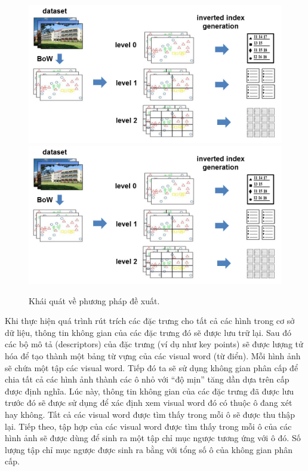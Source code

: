 \begin{figure}[!htbp]
  \begin{center}
    \leavevmode
    \ifpdf
      \includegraphics[scale=0.4]{basicIdea}
    \else
      \includegraphics[scale=0.4]{basicIdea}
    \fi
    \caption[Khái quát về phương pháp đề xuất]{Khái quát về phương pháp đề xuất.}
    \label{FigBasicIdea}
  \end{center}
\end{figure}

Khi thực hiện quá trình rút trích các đặc trưng cho tất cả các hình trong cơ sở dữ liệu, thông tin không gian của các đặc trưng đó sẽ được lưu trữ lại. Sau đó các bộ mô tả (descriptors) của đặc trưng (ví dụ như key points) sẽ được lượng tử hóa để tạo thành một bảng từ vựng của các visual word (từ điển). Mỗi hình ảnh sẽ chứa một tập các visual word. Tiếp đó ta sẽ sử dụng không gian phân cấp để chia tất cả các hình ảnh thành các ô nhỏ với ``độ mịn'' tăng dần dựa trên cấp được định nghĩa. Lúc này, thông tin không gian của các đặc trưng đã được lưu trước đó sẽ được sử dụng để xác định xem visual word đó có thuộc ô đang xét hay không. Tất cả các visual word được tìm thấy trong mỗi ô sẽ được thu thập lại. Tiếp theo, tập hợp của các visual word được tìm thấy trong mỗi ô của các hình ảnh sẽ được dùng để sinh ra một tập chỉ mục ngược tương ứng với ô đó. Số lượng tập chỉ mục ngược được sinh ra bằng với tổng số ô của không gian phân cấp.

